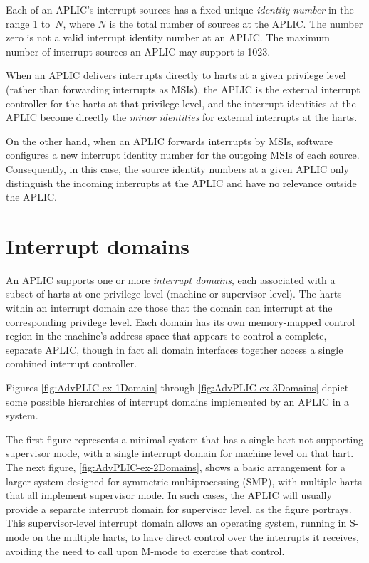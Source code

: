 Each of an APLIC's interrupt sources has a fixed unique
\emph{identity number} in the range 1 to~$N$, where $N$ is the total
number of sources at the APLIC.
The number zero is not a valid interrupt identity number at an APLIC.
The maximum number of interrupt sources an APLIC may support is
1023.

When an APLIC delivers interrupts directly to harts at a given
privilege level (rather than forwarding interrupts as MSIs), the APLIC
is the external interrupt controller for the harts at that privilege
level, and the interrupt identities at the APLIC become directly the
\emph{minor identities} for external interrupts at the harts.

On the other hand, when an APLIC forwards interrupts by MSIs, software
configures a new interrupt identity number for the outgoing MSIs of
each source.
Consequently, in this case, the source identity numbers at a given
APLIC only distinguish the incoming interrupts at the APLIC and have no
relevance outside the APLIC.

\section{Interrupt domains}

An APLIC supports one or more \emph{interrupt domains}, each
associated with a subset of {\RISCV} harts at one privilege level
(machine or supervisor level).
The harts within an interrupt domain are those that the domain can
interrupt at the corresponding privilege level.
Each domain has its own memory-mapped control region in the machine's
address space that appears to control a complete, separate APLIC,
though in fact all domain interfaces together access a single combined
interrupt controller.

Figures \ref{fig:AdvPLIC-ex-1Domain} through
\ref{fig:AdvPLIC-ex-3Domains} depict some possible hierarchies of
interrupt domains implemented by an APLIC in a {\RISCV} system.

The first figure represents a minimal system that has a single hart not
supporting supervisor mode, with a single interrupt domain for machine
level on that hart.
The next figure, \ref{fig:AdvPLIC-ex-2Domains}, shows a basic
arrangement for a larger system designed for symmetric multiprocessing
(SMP), with multiple harts that all implement supervisor mode.
In such cases, the APLIC will usually provide a separate interrupt
domain for supervisor level, as the figure portrays.
This supervisor-level interrupt domain allows an operating system,
running in \mbox{S-mode} on the multiple harts, to have direct control
over the interrupts it receives, avoiding the need to call upon
\mbox{M-mode} to exercise that control.

